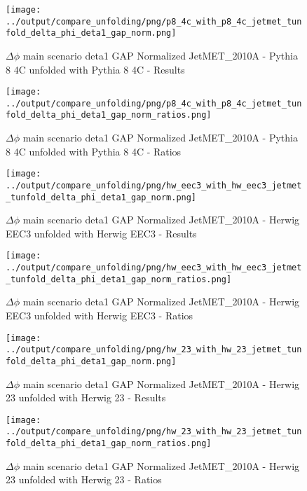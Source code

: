 \documentclass[11pt]{book}
\begin{document}
\begin{figure}[ht]
\centering
\texttt{[image: ../output/compare\_unfolding/png/p8\_4c\_with\_p8\_4c\_jetmet\_tunfold\_delta\_phi\_deta1\_gap\_norm.png]}
\caption{$\Delta\phi$ main scenario deta1 GAP Normalized JetMET\_2010A - Pythia 8 4C unfolded with Pythia 8 4C - Results}
\label{p8_p8_jetmet_tunfold_delta_phi_deta1_gap_norm_a}
\end{figure}

\begin{figure}[ht]
\centering
\texttt{[image: ../output/compare\_unfolding/png/p8\_4c\_with\_p8\_4c\_jetmet\_tunfold\_delta\_phi\_deta1\_gap\_norm\_ratios.png]}
\caption{$\Delta\phi$ main scenario deta1 GAP Normalized JetMET\_2010A - Pythia 8 4C unfolded with Pythia 8 4C - Ratios}
\label{p8_p8_jetmet_tunfold_delta_phi_deta1_gap_norm_b}
\end{figure}

\begin{figure}[ht]
\centering
\texttt{[image: ../output/compare\_unfolding/png/hw\_eec3\_with\_hw\_eec3\_jetmet\_tunfold\_delta\_phi\_deta1\_gap\_norm.png]}
\caption{$\Delta\phi$ main scenario deta1 GAP Normalized JetMET\_2010A - Herwig EEC3 unfolded with Herwig EEC3 - Results}
\label{hw_eec3_hw_eec3_jetmet_tunfold_delta_phi_deta1_gap_norm_a}
\end{figure}

\begin{figure}[ht]
\centering
\texttt{[image: ../output/compare\_unfolding/png/hw\_eec3\_with\_hw\_eec3\_jetmet\_tunfold\_delta\_phi\_deta1\_gap\_norm\_ratios.png]}
\caption{$\Delta\phi$ main scenario deta1 GAP Normalized JetMET\_2010A - Herwig EEC3 unfolded with Herwig EEC3 - Ratios}
\label{hw_eec3_hw_eec3_jetmet_tunfold_delta_phi_deta1_gap_norm_b}
\end{figure}

\begin{figure}[ht]
\centering
\texttt{[image: ../output/compare\_unfolding/png/hw\_23\_with\_hw\_23\_jetmet\_tunfold\_delta\_phi\_deta1\_gap\_norm.png]}
\caption{$\Delta\phi$ main scenario deta1 GAP Normalized JetMET\_2010A - Herwig 23 unfolded with Herwig 23 - Results}
\label{hw_23_hw_23_jetmet_tunfold_delta_phi_deta1_gap_norm_a}
\end{figure}

\begin{figure}[ht]
\centering
\texttt{[image: ../output/compare\_unfolding/png/hw\_23\_with\_hw\_23\_jetmet\_tunfold\_delta\_phi\_deta1\_gap\_norm\_ratios.png]}
\caption{$\Delta\phi$ main scenario deta1 GAP Normalized JetMET\_2010A - Herwig 23 unfolded with Herwig 23 - Ratios}
\label{hw_23_hw_23_jetmet_tunfold_delta_phi_deta1_gap_norm_b}
\end{figure}
\end{document}
